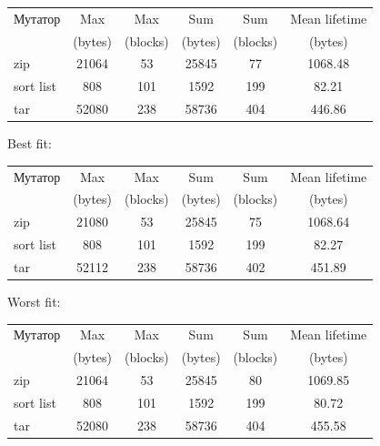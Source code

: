     \begin{center}
    \small
    \begin{tabular}{| l | c | c | c | c | c |}
    \hline
    Мутатор & Max     & Max      & Sum     & Sum      & Mean lifetime \\
            & (bytes) & (blocks) & (bytes) & (blocks) & (bytes) \\
    \hline
    zip & 21064 & 53 & 25845 & 77 & 1068.48\\
    \hline
    sort list & 808 & 101 & 1592 & 199 & 82.21 \\
    \hline
    tar & 52080 & 238 & 58736 & 404 & 446.86 \\
    \hline
    \end{tabular}
    \end{center}

    Best fit:

    \begin{center}
    \small
    \begin{tabular}{| l | c | c | c | c | c |}
    \hline
    Мутатор & Max     & Max      & Sum     & Sum      & Mean lifetime \\
            & (bytes) & (blocks) & (bytes) & (blocks) & (bytes) \\
    \hline
    zip & 21080 & 53 & 25845 & 75 & 1068.64\\
    \hline
    sort list & 808 & 101 & 1592 & 199 & 82.27 \\
    \hline
    tar & 52112 & 238 & 58736 & 402 & 451.89 \\
    \hline
    \end{tabular}
    \end{center}
    
    Worst fit:

    \begin{center}
    \small
    \begin{tabular}{| l | c | c | c | c | c |}
    \hline
    Мутатор & Max     & Max      & Sum     & Sum      & Mean lifetime \\
            & (bytes) & (blocks) & (bytes) & (blocks) & (bytes) \\
    \hline
    zip & 21064 & 53 & 25845 & 80 & 1069.85\\
    \hline
    sort list & 808 & 101 & 1592 & 199 & 80.72\\
    \hline
    tar & 52080 & 238 & 58736 & 404 & 455.58 \\
    \hline
    \end{tabular}
    \end{center}
    
